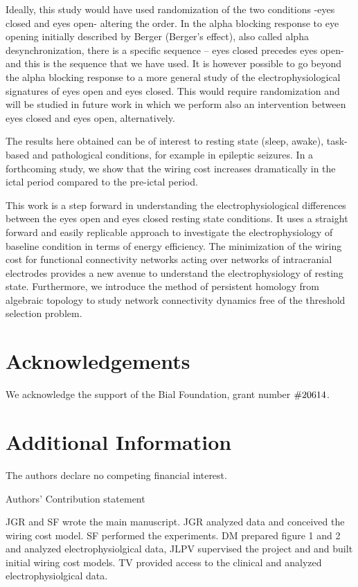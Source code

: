 \documentclass[11pt, onecolumn]{article}
\begin{document}
Ideally, this study would have used randomization of the two conditions -eyes closed and eyes open- altering the order. In the alpha blocking response to eye opening initially described by Berger (Berger’s effect), also called alpha desynchronization, there is a specific sequence – eyes closed precedes eyes open- and this is the sequence that we have used.
It is however possible to go beyond the alpha blocking response to a more general study of the electrophysiological signatures of eyes open and eyes closed. This would require randomization and will be studied in future work in which we perform also an intervention between eyes closed and eyes open, alternatively.

The results here obtained can be of interest to resting state (sleep, awake), task-based and pathological conditions, for example in epileptic seizures. In a forthcoming study, we show that the wiring cost increases dramatically in the ictal period compared to the pre-ictal period.   

This work is a step forward in understanding the electrophysiological differences between the eyes open and eyes closed resting state conditions. It uses a straight forward and easily replicable approach to investigate the electrophysiology of baseline condition in terms of energy efficiency. The minimization of the wiring cost for functional connectivity networks acting over networks of intracranial electrodes provides a new avenue to understand the electrophysiology of resting state. Furthermore, we introduce the method of persistent homology from algebraic topology to study network connectivity dynamics free of the threshold selection problem.


\section*{Acknowledgements}
We acknowledge the support of the Bial Foundation, grant number  $\#206\/14$.
\section*{Additional Information}
The authors declare no competing financial interest.

%



\newpage
Authors' Contribution statement

JGR and SF wrote the main manuscript. JGR analyzed data and conceived the wiring cost model. SF performed the experiments. DM prepared figure 1 and 2 and analyzed electrophysiolgical data, JLPV supervised the project and and built initial wiring cost models. TV provided access to the clinical and analyzed electrophysiolgical data.
\end{document}
